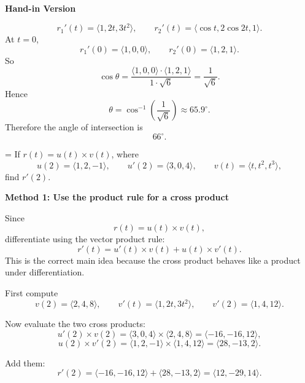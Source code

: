 \documentclass[a4paper,12pt,twocolumn]{article}
\newlength{\problemnumberwidth}
\newenvironment{solutionbox}{\begin{framed}}{\end{framed}}
\newcommand{\problem}[3]{%
  \Needspace{10\baselineskip}%
  \phantomsection\label{#1}%
  \par\vspace{0.8em}%
  \noindent
  \hangindent=\problemnumberwidth
  \hangafter=1
  \makebox[\problemnumberwidth][l]{\textbf{#2.}}#3\par
}
\begin{document}
\begin{solutionbox}
\textbf{Hand-in Version}

\[
r_1'(t)=\langle 1,2t,3t^2\rangle,\qquad
r_2'(t)=\langle \cos t,2\cos 2t,1\rangle.
\]
At \(t=0\),
\[
r_1'(0)=\langle 1,0,0\rangle,\qquad
r_2'(0)=\langle 1,2,1\rangle.
\]
So
\[
\cos\theta=\frac{\langle 1,0,0\rangle\cdot \langle 1,2,1\rangle}{1\cdot \sqrt6}
=\frac{1}{\sqrt6}.
\]
Hence
\[
\theta=\cos^{-1}\!\left(\frac{1}{\sqrt6}\right)\approx 65.9^\circ.
\]
Therefore the angle of intersection is
\[
\boxed{66^\circ.}
\]
\end{solutionbox}

\problem{prob:13-2-52}{52}{If \(r(t)=u(t)\times v(t)\), where
\[
u(2)=\langle 1,2,-1\rangle,\qquad
u'(2)=\langle 3,0,4\rangle,\qquad
v(t)=\langle t,t^2,t^3\rangle,
\]
find \(r'(2)\).}

\begin{solutionbox}
\textbf{Method 1: Use the product rule for a cross product}

\begin{steps}
\item Since
\[
r(t)=u(t)\times v(t),
\]
differentiate using the vector product rule:
\[
r'(t)=u'(t)\times v(t)+u(t)\times v'(t).
\]
This is the correct main idea because the cross product behaves like a product under differentiation.

\item First compute
\[
v(2)=\langle 2,4,8\rangle,\qquad
v'(t)=\langle 1,2t,3t^2\rangle,
\qquad
v'(2)=\langle 1,4,12\rangle.
\]

\item Now evaluate the two cross products:
\[
u'(2)\times v(2)
=\langle 3,0,4\rangle\times \langle 2,4,8\rangle
=\langle -16,-16,12\rangle,
\]
\[
u(2)\times v'(2)
=\langle 1,2,-1\rangle\times \langle 1,4,12\rangle
=\langle 28,-13,2\rangle.
\]

\item Add them:
\[
r'(2)=\langle -16,-16,12\rangle+\langle 28,-13,2\rangle
=\boxed{\langle 12,-29,14\rangle.}
\]
\end{steps}
\end{solutionbox}
\end{document}
